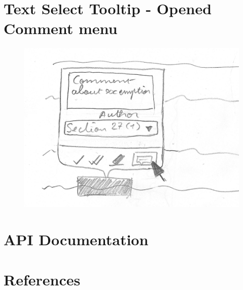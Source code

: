 \documentclass{l4proj}
\begin{document}
\begin{appendices}
    \section{Text Select Tooltip - Opened Comment menu}
    \begin{figure}[H]
        \centering
        \includegraphics[width=\linewidth]{images/wireframes/tooltip_comment.jpg}
    \end{figure}
    \section{API Documentation}
    
\end{appendices}


\newpage


\section*{References}

\printbibliography[heading=none]

\vspace*{\fill}
\doclicenseThis
\end{document}
